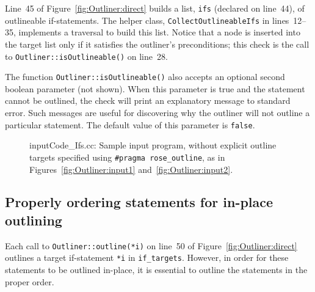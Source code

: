 Line~45 of Figure~\ref{fig:Outliner:direct} builds a list,
\texttt{ifs} (declared on line~44), of outlineable if-statements.  The
helper class, \texttt{CollectOutlineableIfs} in lines~12--35,
implements a traversal to build this list. Notice that a node is
inserted into the target list only if it satisfies the outliner's
preconditions; this check is the call to
\texttt{Outliner::isOutlineable()} on line~28.

The function \texttt{Outliner::isOutlineable()} also accepts an
optional second boolean parameter (not shown). When this parameter is
true and the statement cannot be outlined, the check will print an
explanatory message to standard error. Such messages are useful for
discovering why the outliner will not outline a particular
statement. The default value of this parameter is \texttt{false}.

\begin{figure}[!h]
{\indent
{\mySmallFontSize
\begin{latexonly}
   
\end{latexonly}
\begin{htmlonly}
   
\end{htmlonly}

}
}
\caption{inputCode\_Ifs.cc: Sample input program, without explicit
outline targets specified using \texttt{\#pragma rose\_outline}, as in
Figures~\ref{fig:Outliner:input1}
and~\ref{fig:Outliner:input2}.}
\label{fig:Outliner:input3}
\end{figure}

\subsection{Properly ordering statements for in-place outlining}
\label{sec:Outliner:direct:ordering}

Each call to \texttt{Outliner::outline(*i)} on line~50 of
Figure~\ref{fig:Outliner:direct} outlines a target if-statement
\texttt{*i} in \texttt{if\_targets}. However, in order for these
statements to be outlined in-place, it is essential to outline the
statements in the proper order.

